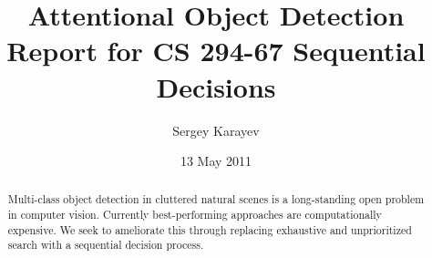 \documentclass[10pt]{article}
\title{Attentional Object Detection\\
Report for CS 294-67 Sequential Decisions}
\author{Sergey Karayev}
\date{13 May 2011}
\begin{document}
\maketitle

\begin{abstract}
  Multi-class object detection in cluttered natural scenes is a long-standing open problem in computer vision. Currently best-performing approaches are computationally expensive. We seek to ameliorate this through replacing exhaustive and unprioritized search with a sequential decision process.
\end{abstract}








\small

\end{document}
